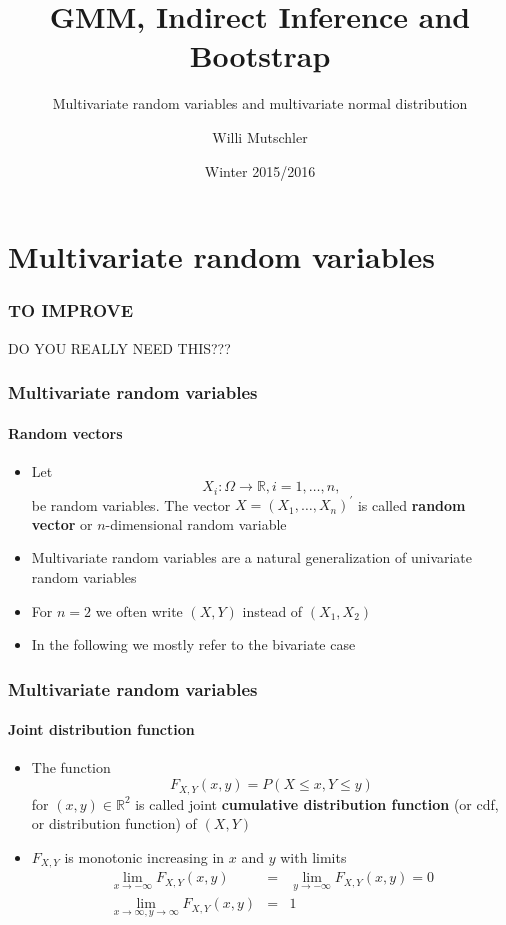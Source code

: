 \documentclass[notes=show]{beamer}
\begin{document}
\title{GMM, Indirect Inference and Bootstrap}
\subtitle{Multivariate random variables and multivariate normal distribution}
\author[Willi Mutschler]{Willi Mutschler}
\date{Winter 2015/2016}
\maketitle

\section{Multivariate random variables}
\begin{frame}\frametitle{TO IMPROVE}
  DO YOU REALLY NEED THIS???
\end{frame}
\begin{frame}\frametitle{Multivariate random variables}\framesubtitle{Random vectors}
\begin{itemize}
    \item Let
    \begin{equation*}
        X_{i}{:\Omega }\rightarrow \mathbb{R},i=1,\ldots ,n,
    \end{equation*}
    be random variables. The vector $X=(X_{1},\ldots ,X_{n})^{\prime }$ is called \textbf{random vector }or $n$-dimensional random variable
    \item Multivariate random variables are a natural generalization of univariate random variables
    \item For $n=2$ we often write $\left( X,Y\right) $ instead of $(X_{1},X_{2}) $
    \item In the following we mostly refer to the bivariate case
\end{itemize}
\end{frame}


\begin{frame}\frametitle{Multivariate random variables}\framesubtitle{Joint distribution function}
\begin{itemize}
    \item The function
        \begin{equation*}
            F_{X,Y}(x,y)=P(X\leq x,Y\leq y)
        \end{equation*}%
        for $\left( x,y\right) \in \mathbb{R}^{2}$ is called joint \textbf{cumulative distribution function} (or cdf, or distribution function) of $\left( X,Y\right)$
    \item $F_{X,Y}$ is monotonic increasing in $x$ and $y$ with limits
        \begin{eqnarray*}
            \lim_{x\rightarrow -\infty }F_{X,Y}\left( x,y\right) &=&\lim_{y\rightarrow -\infty }F_{X,Y}\left( x,y\right) =0 \\
            \lim_{x\rightarrow \infty ,y\rightarrow \infty }F_{X,Y}\left( x,y\right) &=&1
        \end{eqnarray*}
\end{itemize}
\end{frame}
\end{document}
